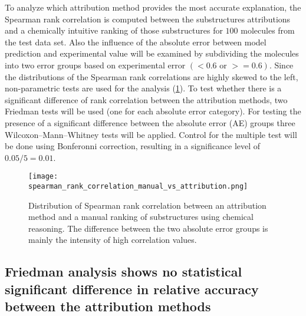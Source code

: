 

To analyze which attribution method provides the most accurate
explanation, the Spearman rank correlation is computed between the
substructures attributions and a chemically intuitive ranking of those
substructures for $100$ molecules from the test data set. Also the influence of the absolute error between model
prediction and experimental value will be examined by subdividing the
molecules into two error groups based on experimental error $(<0.6 \text{ or } >=0.6)$. Since the distributions of
the Spearman rank correlations are highly skewed to the left,
non-parametric tests are used for the analysis (\cref{fig:spearman_corr_manual}). To test whether there is
a significant difference of rank correlation between the attribution
methods, two Friedman tests will be used (one for each absolute error
category). For testing the presence of a significant difference between
the absolute error (AE) groups three Wilcoxon--Mann--Whitney tests will be applied.
Control for the multiple test will be done using Bonferonni correction, 
resulting in a significance level of $0.05/5 = 0.01$.


\begin{figure}[h]
    \centering
    \texttt{[image: spearman\_rank\_correlation\_manual\_vs\_attribution.png]}
    \caption{Distribution of Spearman rank correlation between an attribution method 
        and a manual ranking of substructures using chemical reasoning. The difference 
        between the two absolute error groups is mainly the intensity of high 
        correlation values.
    }
    \label{fig:spearman_corr_manual}
\end{figure}


\subsection{Friedman analysis shows no statistical significant difference in relative accuracy between the attribution methods}


